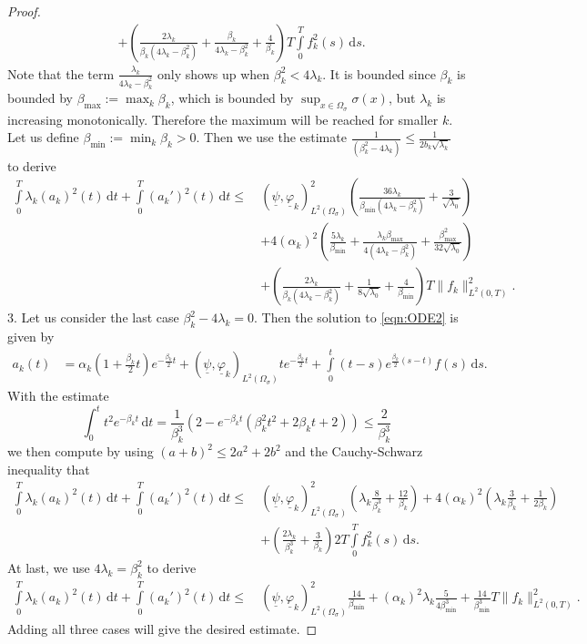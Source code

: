 \documentclass[a4paper,11pt]{article}
\newcommand{\intT}{\int\limits_{0}^T}
\newcommand{\omsig}{\Omega_{\sigma}}
\renewcommand{\vec}[1]{\underline{#1}}
\begin{document}
\begin{proof}
\begin{align*}
		&+\left(\frac{2\lambda_k}{\beta_k(4\lambda_k-\beta_k^2)}+\frac{\beta_k}{4\lambda_k-\beta_k^2}+\frac{4}{\beta_k}\right)T\intT f_k^2(s)\,\mathrm ds.
	\end{align*}
	Note that 	the term $\frac{\lambda_k}{4\lambda_k-\beta_k^2}$ only shows up when $\beta_k^2<4\lambda_k$. It is bounded since $\beta_k$ is bounded by $\beta_{\max} := \max_k \beta_k$, which is bounded by $\sup_{x\in\omsig} \sigma(x)$, but $\lambda_k$ is increasing monotonically. Therefore the maximum will be reached for smaller $k$.\\
	Let us define $\beta_{\min} := \min_k \beta_k>0$. Then we use the estimate $ \frac{1}{(\beta_k^2-4\lambda_k)}\leq \frac{1}{2b_k\sqrt{\lambda_k}} $ to derive
	\begin{align*}
		\intT \lambda_k( {a_k})^2(t)\,\mathrm dt+\intT ( {a_k}')^2(t)\,\mathrm dt\leq\ & (\vec \psi,\vec \varphi_k)^2_{L^2(\omsig)}\left(\frac{36\lambda_k }{\beta_{\min}(4\lambda_k-\beta_k^2)}+\frac{3 }{\sqrt{\lambda_0}} \right)\\
		& + 4(\alpha_k)^2\left(\frac{5\lambda_k}{\beta_{\min}}+\frac{\lambda_k\beta_{\max}}{4(4\lambda_k-\beta_k^2)}+ \frac{\beta_{\max}^2}{32\sqrt{\lambda_0}}\right)\\
		&+\left(\frac{2\lambda_k}{\beta_k(4\lambda_k-\beta_k^2)}+\frac{1}{8\sqrt{\lambda_0}}+\frac{4}{\beta_{\min}}\right)T\| f_k\|^2_{L^2(0,T)}.
	\end{align*}
	3. Let us consider the last case $\beta_k^2-4\lambda_k=0$. Then the solution to \eqref{eqn:ODE2} is given by
	\begin{align*}
		 {a_k} (t) &=\alpha_k(1+\frac{\beta_k}{2}t) e^{-\frac{\beta_k}{2}t}+(\vec \psi,\vec \varphi_k)_{L^2(\omsig)} te^{-\frac{\beta_k}{2}t} +\int\limits_0^t(t-s)e^{\frac{\beta_k}{2}(s-t)}f(s) \,\mathrm ds.
	\end{align*}
	With the estimate
	\[
	\int_0^t t^2 e^{-\beta_k t}\,\mathrm dt= \frac{1}{\beta_k^3} (2-e^{-\beta_kt}(\beta_k^2 t^2+2\beta_kt+2))\leq \frac{2}{\beta_k^3} 
	\]
	we then compute by using  $(a+b)^2\leq 2 a^2+2b^2$ and the Cauchy-Schwarz inequality that
	\begin{align*}
		\intT \lambda_k( {a_k})^2(t)\,\mathrm dt+\intT ( {a_k}')^2(t)\,\mathrm dt\leq\ & (\vec \psi,\vec \varphi_k)^2_{L^2(\omsig)}\left(\lambda_k\frac{8 }{\beta_k^3}+\frac{12}{\beta_k}\right)+4(\alpha_k)^2\left(\lambda_k\frac{3}{\beta_k}+\frac{1}{2\beta_k}\right)\\
		&+\left(\frac{2\lambda_k}{\beta_k^3}+\frac{3}{\beta_k}\right)2T\intT f_k^2(s)\,\mathrm ds.
	\end{align*}
	At last, we use  $4\lambda_k=\beta_k^2$ to derive	
	\begin{align*}
		\intT \lambda_k( {a_k})^2(t)\,\mathrm dt+\intT ( {a_k}')^2(t)\,\mathrm dt\leq\ & (\vec \psi,\vec \varphi_k)^2_{L^2(\omsig)}\frac{14 }{\beta_{\min}}+(\alpha_k)^2\lambda_k\frac{5}{4\beta_{\min}^3}	  +\frac{14}{\beta_{\min}^3}T\| f_k\|^2_{L^2(0,T)}.
	\end{align*}
	Adding all three cases will give the desired estimate.	
\end{proof}
\end{document}
